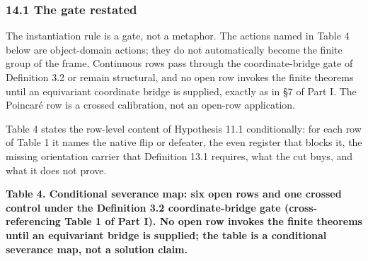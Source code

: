 \documentclass[10pt,twocolumn]{article}
\begin{document}
\subsubsection{14.1 The gate restated}\label{the-gate-restated}

The instantiation rule is a gate, not a metaphor. The actions named in
Table 4 below are object-domain actions; they do not automatically
become the finite group of the frame. Continuous rows pass through the
coordinate-bridge gate of Definition 3.2 or remain structural, and no
open row invokes the finite theorems until an equivariant coordinate
bridge is supplied, exactly as in §7 of Part I. The Poincaré row is a
crossed calibration, not an open-row application.

Table 4 states the row-level content of Hypothesis 11.1 conditionally:
for each row of Table 1 it names the native flip or defeater, the even
register that blocks it, the missing orientation carrier that Definition
13.1 requires, what the cut buys, and what it does not prove.

\textbf{Table 4. Conditional severance map: six open rows and one
crossed control under the Definition 3.2 coordinate-bridge gate
(cross-referencing Table 1 of Part I). No open row invokes the finite
theorems until an equivariant bridge is supplied; the table is a
conditional severance map, not a solution claim.}
\end{document}
